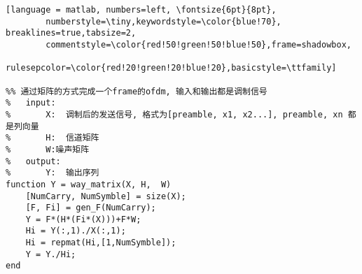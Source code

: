 
\begin{lstlisting}[language = matlab, numbers=left, \fontsize{6pt}{8pt}, 
        numberstyle=\tiny,keywordstyle=\color{blue!70},  breaklines=true,tabsize=2,
        commentstyle=\color{red!50!green!50!blue!50},frame=shadowbox,  
        rulesepcolor=\color{red!20!green!20!blue!20},basicstyle=\ttfamily]  

%% 通过矩阵的方式完成一个frame的ofdm, 输入和输出都是调制信号
%	input:
%		X:	调制后的发送信号, 格式为[preamble, x1, x2...], preamble, xn 都是列向量
%		H:	信道矩阵
%		W:噪声矩阵
%	output:
%		Y:	输出序列
function Y = way_matrix(X, H,  W)
	[NumCarry, NumSymble] = size(X);
	[F, Fi] = gen_F(NumCarry);
	Y = F*(H*(Fi*(X)))+F*W;
	Hi = Y(:,1)./X(:,1);
	Hi = repmat(Hi,[1,NumSymble]);
	Y = Y./Hi;
end
 \end{lstlisting}  
